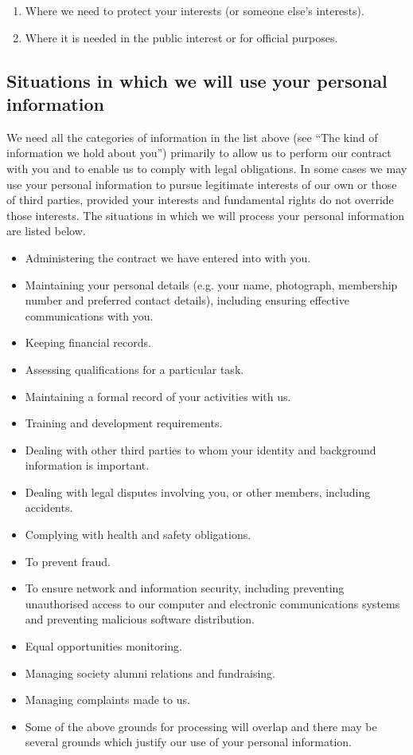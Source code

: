 \documentclass[12pt]{article}
\begin{document}
\begin{enumerate}
\item Where we need to protect your interests (or someone else's interests).
\item Where it is needed in the public interest or for official purposes.
\end{enumerate}

\subsection{Situations in which we will use your personal information}

We need all the categories of information in the list above (see “The kind of information we hold about you”) primarily to allow us to perform our contract with you and to enable us to comply with legal obligations. In some cases we may use your personal information to pursue legitimate interests of our own or those of third parties, provided your interests and fundamental rights do not override those interests. The situations in which we will process your personal information are listed below. 

\begin{itemize}
\item Administering the contract we have entered into with you.
\item Maintaining your personal details (e.g. your name, photograph, membership number and preferred contact details), including ensuring effective communications with you.
\item Keeping financial records.
\item Assessing qualifications for a particular task.
\item Maintaining a formal record of your activities with us.
\item Training and development requirements.
\item Dealing with other third parties to whom your identity and background information is important. 
\item Dealing with legal disputes involving you, or other members, including accidents.
\item Complying with health and safety obligations.
\item To prevent fraud.
\item To ensure network and information security, including preventing unauthorised access to our computer and electronic communications systems and preventing malicious software distribution.
\item Equal opportunities monitoring.
\item Managing society alumni relations and fundraising.
\item Managing complaints made to us.
\item Some of the above grounds for processing will overlap and there may be several grounds which justify our use of your personal information. 
\end{itemize}
\end{document}

